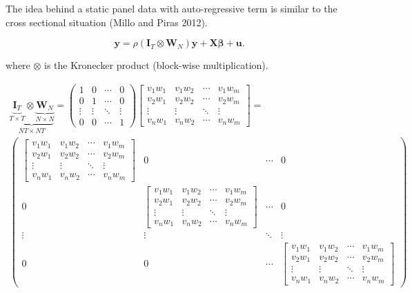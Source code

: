 \documentclass[
  letterpaper,
  DIV=11,
  numbers=noendperiod]{scrreprt}
\begin{document}
The idea behind a static panel data with auto-regressive term is similar
to the cross sectional situation (Millo and Piras 2012).

\[
        {\boldsymbol{\mathbf{y}}}= \rho(\boldsymbol{\mathbf{I}}_T\otimes {\boldsymbol{\mathbf{W}}_N}){\boldsymbol{\mathbf{y}}}+{\boldsymbol{\mathbf{X}}}{\boldsymbol{\mathbf{\beta}}}+ {\boldsymbol{\mathbf{u}}}.
\]

where \(\otimes\) is the Kronecker product (block-wise multiplication).

\[
\begin{split}
\underbrace{\underbrace{\boldsymbol{\mathbf{I}}_T}_{T \times T} \otimes \underbrace{\boldsymbol{\mathbf{W}}_N}_{N \times N}}_{NT \times NT}=
\begin{pmatrix}
      1 & 0 & \cdots & 0  \\
      0 & 1 & \cdots & 0  \\
      \vdots & \vdots & \ddots & \vdots \\
      0 & 0 & \cdots & 1
\end{pmatrix}
\left[\begin{array}{cccc}
v_{1} w_{1} & v_{1} w_{2} & \cdots & v_{1} w_{m} \\
v_{2} w_{1} & v_{2} w_{2} & \cdots & v_{2} w_{m} \\
\vdots & \vdots & \ddots & \vdots \\
v_{n} w_{1} & v_{n} w_{2} & \cdots & v_{n} w_{m}
\end{array}\right] =\\
\begin{pmatrix}
      \left[\begin{array}{cccc}
v_{1} w_{1} & v_{1} w_{2} & \cdots & v_{1} w_{m} \\
v_{2} w_{1} & v_{2} w_{2} & \cdots & v_{2} w_{m} \\
\vdots & \vdots & \ddots & \vdots \\
v_{n} w_{1} & v_{n} w_{2} & \cdots & v_{n} w_{m}
\end{array}\right] & 0 & \cdots & 0  \\
      0 & \left[\begin{array}{cccc}
v_{1} w_{1} & v_{1} w_{2} & \cdots & v_{1} w_{m} \\
v_{2} w_{1} & v_{2} w_{2} & \cdots & v_{2} w_{m} \\
\vdots & \vdots & \ddots & \vdots \\
v_{n} w_{1} & v_{n} w_{2} & \cdots & v_{n} w_{m}
\end{array}\right] & \cdots & 0  \\
      \vdots & \vdots & \ddots & \vdots \\
      0 & 0 & \cdots & \left[\begin{array}{cccc}
v_{1} w_{1} & v_{1} w_{2} & \cdots & v_{1} w_{m} \\
v_{2} w_{1} & v_{2} w_{2} & \cdots & v_{2} w_{m} \\
\vdots & \vdots & \ddots & \vdots \\
v_{n} w_{1} & v_{n} w_{2} & \cdots & v_{n} w_{m}
\end{array}\right]
\end{pmatrix}
\end{split}
\]
\end{document}
